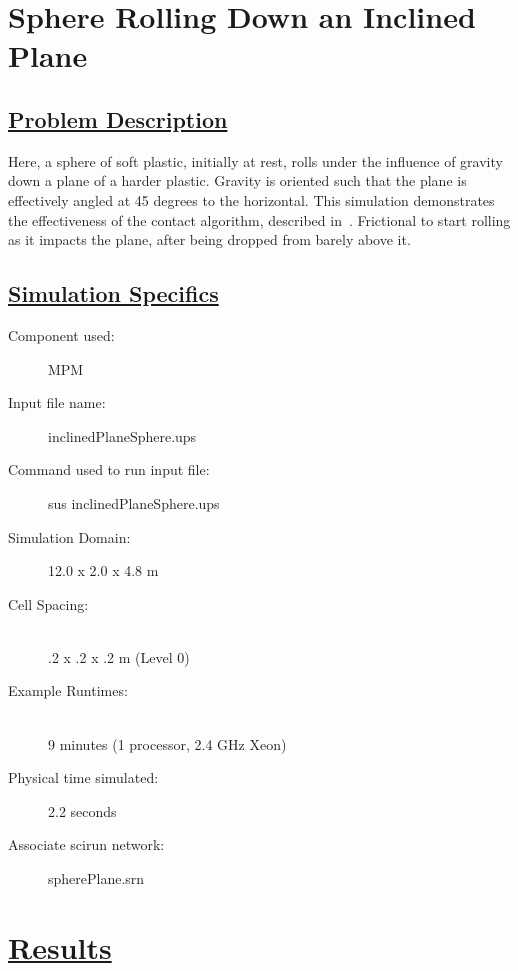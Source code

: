 \documentclass[fleqn]{article}
\begin{document}
\section*{\center Sphere Rolling Down an Inclined Plane}
\subsection*{\underline{Problem Description}}
Here, a sphere of soft plastic, initially at rest, rolls under the
influence of gravity down a plane of a harder plastic.  Gravity is
oriented such that the plane is effectively angled at 45 degrees to
the horizontal.  This simulation demonstrates the effectiveness of
the contact algorithm, described in~\cite{bard01}.  Frictional
to start rolling as it impacts the plane, after being dropped from
barely above it.
 
\subsection*{\underline{Simulation Specifics}}
\begin{description} 
\item [Component used:] \hfill MPM
\item [Input file name:] \hfill inclinedPlaneSphere.ups
\item [Command used to run input file:]\hfill sus inclinedPlaneSphere.ups
\item [Simulation Domain:]\hfill    12.0 x 2.0 x 4.8 m

\item [Cell Spacing:]\hfill \\ 
.2 x .2 x .2 m (Level 0)

\item [Example Runtimes:] \hfill \\
 9 minutes  (1 processor, 2.4 GHz Xeon)\\

\item [Physical time simulated:] \hfill 2.2 seconds

\item [Associate scirun network:] \hfill spherePlane.srn

\end{description}

\section*{\underline{Results}}
\end{document}
